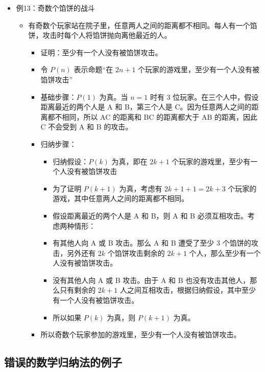 \documentclass[UTF8]{report}
\theoremstyle{MyLineTheoremStyle} %
\theoremstyle{MyBlockTheoremStyle} %
\theoremstyle{MySubsubsectionStyle} %
\begin{document}
            \begin{itemize}
            \item 例13：奇数个馅饼的战斗
            \begin{itemize}
                \item 有奇数个玩家站在院子里，任意两人之间的距离都不相同。每人有一个馅饼，攻击时每个人将馅饼抛向离他最近的人。
                \begin{itemize}
                    \item 证明：至少有一个人没有被馅饼攻击。
                    \item 令 $P(n)$ 表示命题“在 $2n+1$ 个玩家的游戏里，至少有一个人没有被馅饼攻击”
                    \item 基础步骤：$P(1)$ 为真。当 $n=1$ 时有 3 位玩家。在三个人中，假设距离最近的两个人是 A 和 B，第三个人是 C。因为任意两人之间的距离都不相同，所以 AC 的距离和 BC 的距离都大于 AB 的距离，因此 C 不会受到 A 和 B 的攻击。
                    \item 归纳步骤：
                    \begin{itemize}
                        \item 归纳假设：$P(k)$ 为真，即在 $2k+1$ 个玩家的游戏里，至少有一个人没有被馅饼攻击
                        \item 为了证明 $P(k+1)$ 为真，考虑有 $2k+1+1=2k+3$ 个玩家的游戏，其中任意两人之间的距离都不相同。
                        \item 假设距离最近的两个人是 A 和 B，则 A 和 B 必须互相攻击。考虑两种情形：
                        \item 有其他人向 A 或 B 攻击。那么 A 和 B 遭受了至少 3 个馅饼的攻击，另外还有 $2k$ 个馅饼攻击剩余的 $2k+1$ 个人，那么至少有一个人没有被馅饼攻击。
                        \item 没有其他人向 A 或 B 攻击。由于 A 和 B 也没有攻击其他人，那么只有剩余的 $2k+1$ 人之间互相攻击，根据归纳假设，其中至少有一个人没有被馅饼攻击。
                        \item 所以如果 $P(k)$ 为真，则 $P(k+1)$ 为真。
                    \end{itemize}
                    \item 所以奇数个玩家参加的游戏里，至少有一个人没有被馅饼攻击。
                \end{itemize}
            \end{itemize}
        \end{itemize}

        \subsection{错误的数学归纳法的例子}
\end{document}
